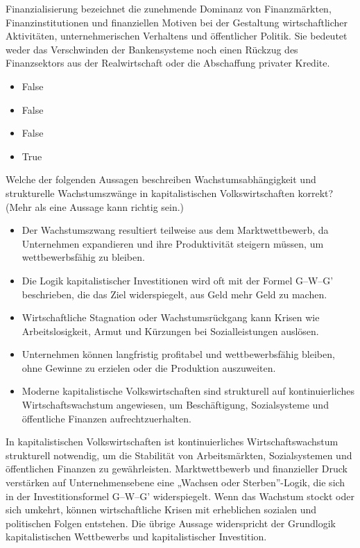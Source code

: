 \documentclass[
  nswissgerman,
  a4paper,
  openany]{book}
\providecommand{\tightlist}{%
  \setlength{\itemsep}{0pt}\setlength{\parskip}{0pt}}
\begin{document}
Finanzialisierung bezeichnet die zunehmende Dominanz von Finanzmärkten,
Finanzinstitutionen und finanziellen Motiven bei der Gestaltung
wirtschaftlicher Aktivitäten, unternehmerischen Verhaltens und
öffentlicher Politik. Sie bedeutet weder das Verschwinden der
Bankensysteme noch einen Rückzug des Finanzsektors aus der
Realwirtschaft oder die Abschaffung privater Kredite.

\begin{itemize}
\tightlist
\item
  False
\item
  False
\item
  False
\item
  True
\end{itemize}

Welche der folgenden Aussagen beschreiben Wachstumsabhängigkeit und
strukturelle Wachstumszwänge in kapitalistischen Volkswirtschaften
korrekt? (Mehr als eine Aussage kann richtig sein.)

\begin{itemize}
\tightlist
\item[$\square$]
  Der Wachstumszwang resultiert teilweise aus dem Marktwettbewerb, da
  Unternehmen expandieren und ihre Produktivität steigern müssen, um
  wettbewerbsfähig zu bleiben.
\item[$\square$]
  Die Logik kapitalistischer Investitionen wird oft mit der Formel
  G--W--G' beschrieben, die das Ziel widerspiegelt, aus Geld mehr Geld
  zu machen.
\item[$\square$]
  Wirtschaftliche Stagnation oder Wachstumsrückgang kann Krisen wie
  Arbeitslosigkeit, Armut und Kürzungen bei Sozialleistungen auslösen.
\item[$\square$]
  Unternehmen können langfristig profitabel und wettbewerbsfähig
  bleiben, ohne Gewinne zu erzielen oder die Produktion auszuweiten.
\item[$\square$]
  Moderne kapitalistische Volkswirtschaften sind strukturell auf
  kontinuierliches Wirtschaftswachstum angewiesen, um Beschäftigung,
  Sozialsysteme und öffentliche Finanzen aufrechtzuerhalten.
\end{itemize}

In kapitalistischen Volkswirtschaften ist kontinuierliches
Wirtschaftswachstum strukturell notwendig, um die Stabilität von
Arbeitsmärkten, Sozialsystemen und öffentlichen Finanzen zu
gewährleisten. Marktwettbewerb und finanzieller Druck verstärken auf
Unternehmensebene eine „Wachsen oder Sterben''-Logik, die sich in der
Investitionsformel G--W--G' widerspiegelt. Wenn das Wachstum stockt oder
sich umkehrt, können wirtschaftliche Krisen mit erheblichen sozialen und
politischen Folgen entstehen. Die übrige Aussage widerspricht der
Grundlogik kapitalistischen Wettbewerbs und kapitalistischer
Investition.
\end{document}

